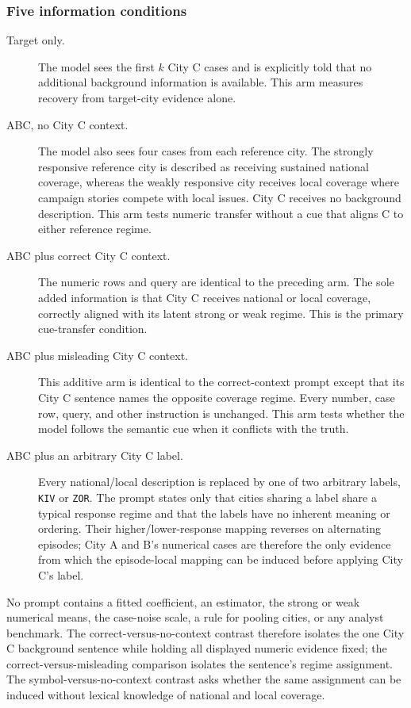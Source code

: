 \subsubsection{Five information conditions}
\begin{description}
  \item[Target only.]
  The model sees the first \(k\) City C cases and is explicitly told that no
  additional background information is available. This arm measures recovery
  from target-city evidence alone.

  \item[ABC, no City C context.]
  The model also sees four cases from each reference city. The strongly responsive
  reference city is described as receiving sustained national coverage, whereas
  the weakly responsive city receives local coverage where campaign stories
  compete with local issues. City C receives no background description. This arm
  tests numeric transfer without a cue that aligns C to either reference regime.

  \item[ABC plus correct City C context.]
  The numeric rows and query are identical to the preceding arm. The sole added
  information is that City C receives national or local coverage, correctly
  aligned with its latent strong or weak regime. This is the primary cue-transfer
  condition.

  \item[ABC plus misleading City C context.]
  This additive arm is identical to the correct-context prompt except that its
  City C sentence names the opposite coverage regime. Every number, case row,
  query, and other instruction is unchanged. This arm tests whether the model
  follows the semantic cue when it conflicts with the truth.

  \item[ABC plus an arbitrary City C label.]
  Every national/local description is replaced by one of two arbitrary labels,
  \texttt{KIV} or \texttt{ZOR}. The prompt states only that cities sharing a label
  share a typical response regime and that the labels have no inherent meaning or
  ordering. Their higher/lower-response mapping reverses on alternating episodes;
  City A and B's numerical cases are therefore the only evidence from which the
  episode-local mapping can be induced before applying City C's label.
\end{description}

No prompt contains a fitted coefficient, an estimator, the strong or weak
numerical means, the case-noise scale, a rule for pooling cities, or any analyst
benchmark. The correct-versus-no-context contrast therefore isolates the one City
C background sentence while holding all displayed numeric evidence fixed; the
correct-versus-misleading comparison isolates the sentence's regime assignment.
The symbol-versus-no-context contrast asks whether the same assignment can be
induced without lexical knowledge of national and local coverage.

